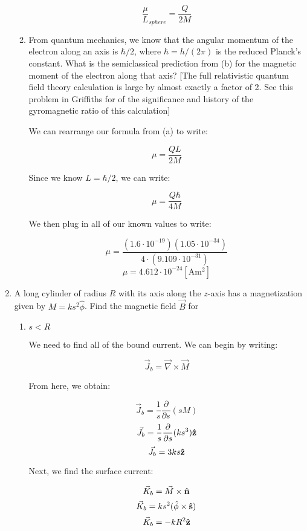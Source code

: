\begin{enumerate}
\begin{enumerate}
        $$\boxed{\frac{\mu}{L}_{sphere}=\frac{Q}{2M}}$$

      \item From quantum mechanics, we know that the angular momentum of the electron along an axis is $\hbar/2$, where $\hbar=h/(2\pi)$ is the reduced Planck’s constant. What is the semiclassical prediction from (b) for the magnetic moment of the electron along that axis? [The full relativistic quantum field theory calculation is large by almost exactly a factor of 2.  See this problem in Griffiths for of the significance and history of the gyromagnetic ratio of this calculation]

        We can rearrange our formula from (a) to write:

        $$\mu=\frac{QL}{2M}$$

        Since we know $L=\hbar/2$, we can write:

        $$\mu=\frac{Q\hbar}{4M}$$

        We then plug in all of our known values to write:

        $$\mu=\frac{(1.6\cdot10^{-19})(1.05\cdot10^{-34})}{4\cdot(9.109\cdot10^{-31})}$$
        $$\boxed{\mu=4.612\cdot10^{-24}[\si{\ampere\meter\squared}]}$$

    \end{enumerate}

  \item A long cylinder of radius $R$ with its axis along the $z$-axis has a magnetization given by $M=ks^2\hat{\phi}$. Find the magnetic field $\vec{B}$ for 

    \begin{enumerate}

      \item $s<R$

        We need to find all of the bound current. We can begin by writing:

        $$\vec{J}_b=\vec{\nabla}\times\vec{M}$$

        From here, we obtain:

        $$\vec{J}_b=\frac{1}{s}\frac{\partial}{\partial s}(sM)$$
        $$\vec{J}_b=\frac{1}{s}\frac{\partial}{\partial s}(ks^3)\bold{\hat{z}}$$
        $$\vec{J}_b=3ks\bold{\hat{z}}$$

        Next, we find the surface current:

        $$\vec{K}_b=\vec{M}\times\bold{\hat{n}}$$
        $$\vec{K}_b=ks^2(\hat{\phi}\times\bold{\hat{s}})$$
        $$\vec{K}_b=-kR^2\bold{\hat{z}}$$


\end{enumerate}
\end{enumerate}
